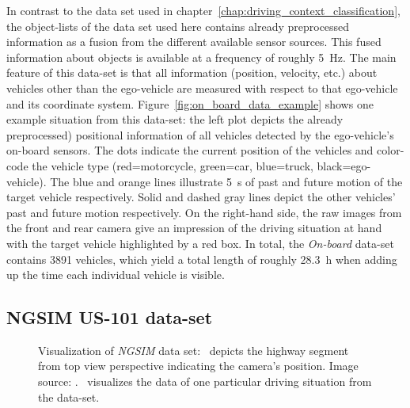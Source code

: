 In contrast to the data set used in chapter~\ref{chap:driving_context_classification}, the object-lists of the data set used here contains already preprocessed information as a fusion from the different available sensor sources.
This fused information about objects is available at a frequency of roughly \SI{5}{\hertz}.
The main feature of this data-set is that all information (position, velocity, etc.) about vehicles other than the ego-vehicle are measured with respect to that ego-vehicle and its coordinate system.
Figure~\ref{fig:on_board_data_example} shows one example situation from this data-set: the left plot depicts the already preprocessed) positional information of all vehicles detected by the ego-vehicle's on-board sensors.
The dots indicate the current position of the vehicles and color-code the vehicle type (red=motorcycle, green=car, blue=truck, black=ego-vehicle).
The blue and orange lines illustrate \SI{5}{\second} of past and future motion of the target vehicle respectively.
Solid and dashed gray lines depict the other vehicles' past and future motion respectively.
On the right-hand side, the raw images from the front and rear camera give an impression of the driving situation at hand with the target vehicle highlighted by a red box.
In total, the \emph{On-board} data-set contains \num{3891} vehicles, which yield a total length of roughly \SI{28.3}{\hour} when adding up the time each individual vehicle is visible.

\subsection{\acs{NGSIM} US-101 data-set}
\label{subsec:ngsim-dataset}

\begin{figure}[t!]
	\centering
    \caption{Visualization of \emph{\ac{NGSIM}} data set:~\protect{} depicts the highway segment from top view perspective indicating the camera's position. Image source: \textcite{NGSIM-US101}.~\protect{} visualizes the data of one particular driving situation from the data-set.}\label{fig:ngsim_dataset}
\end{figure}

